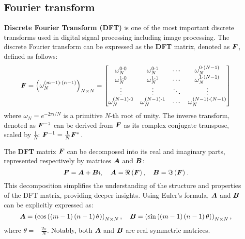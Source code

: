 \subsection{Fourier transform}
\label{appendix:fourier}
\textbf{Discrete Fourier Transform (DFT)} is one of the most important discrete transforms used in digital signal processing including image processing.
The discrete Fourier transform can be expressed as the \textbf{DFT} matrix, denoted as ${\bm{F}}$, defined as follows:
\begin{equation}
    {\bm{F}} = \left( \omega_N^{\left(m-1\right)\cdot\left(n-1\right)} \right)_{N \times N}=
\begin{bmatrix}
 \omega_N^{0 \cdot 0}     & \omega_N^{0 \cdot 1}     & \cdots & \omega_N^{0 \cdot (N-1)}     \\
 \omega_N^{1 \cdot 0}     & \omega_N^{1 \cdot 1}     & \cdots & \omega_N^{1 \cdot (N-1)}     \\
 \vdots                   & \vdots                   & \ddots & \vdots                       \\
 \omega_N^{(N-1) \cdot 0} & \omega_N^{(N-1) \cdot 1} & \cdots & \omega_N^{(N-1) \cdot (N-1)} \\
\end{bmatrix}
\end{equation}
where $\omega_N = e^{-{2\pi i/N}}$ is a primitive $N$-th root of unity. 
The inverse transform, denoted as ${\bm{F}}^{-1}$ can be derived from ${\bm{F}}$ as its complex conjugate transpose, scaled by $\frac{1}{N}$: ${\bm{F}}^{-1} = \frac{1}{N}{\bm{F}}^\ast$.

The \textbf{DFT} matrix ${\bm{F}}$ can be decomposed into its real and imaginary parts, represented respectively by matrices ${\bm{A}}$ and ${\bm{B}}$:
\begin{equation}
\label{eq:decomposition}
    {\bm{F}} = {\bm{A}} + {\bm{B}} i,\quad {\bm{A}} = \Re\left({\bm{F}}\right),\quad {\bm{B}} = \Im\left({\bm{F}}\right).
\end{equation}
This decomposition simplifies the understanding of the structure and properties of the DFT matrix, providing deeper insights. Using Euler’s formula, ${\bm{A}}$ and ${\bm{B}}$ can be explicitly expressed as:
\begin{equation}
    {\bm{A}} = \left(\cos\left( \left(m-1\right)\left(n-1\right)\theta \right)\right)_{N\times N},\quad 
    {\bm{B}} = \left(\sin\left( \left(m-1\right)\left(n-1\right)\theta \right)\right)_{N\times N},
\end{equation}
where $\theta=-\frac{2\pi}{N}$. 
Notably, both ${\bm{A}}$ and ${\bm{B}}$ are real symmetric matrices.

